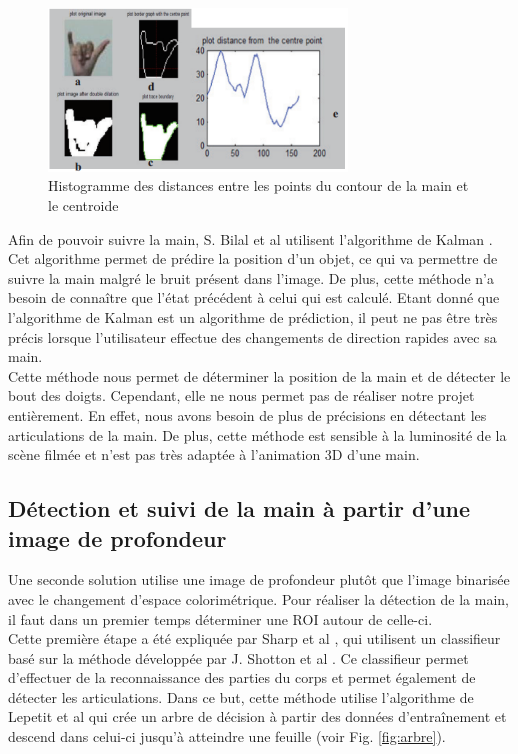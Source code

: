 \begin{figure}[!h]
\center
\includegraphics[width=300px]{images/handHisto.png}
\caption{Histogramme des distances entre les points du contour de la main et le centroide}
\label{fig:handHisto}
\end{figure}

Afin de pouvoir suivre la main, S. Bilal et al \cite{haarlike} utilisent l'algorithme de Kalman \cite{kalman}.
Cet algorithme permet de prédire la position d'un objet, ce qui va permettre de suivre la main malgré
le bruit présent dans l'image. De plus, cette méthode n'a besoin de connaître que l'état précédent à celui
qui est calculé. Etant donné que l'algorithme de Kalman est un algorithme de prédiction, il peut ne pas être très
précis lorsque l'utilisateur effectue des changements de direction rapides avec sa main.\\

Cette méthode nous permet de déterminer la position de la main et de détecter le bout des doigts. Cependant, elle ne nous permet
pas de réaliser notre projet entièrement. En effet, nous avons besoin de plus de précisions en détectant les articulations
de la main. De plus, cette méthode est sensible à la luminosité de la scène filmée et n'est pas très adaptée
à l'animation 3D d'une main.

\subsection{Détection et suivi de la main à partir d'une image de profondeur}
Une seconde solution utilise une image de profondeur plutôt que l'image binarisée avec le changement d'espace colorimétrique.
Pour réaliser la détection de la main, il faut dans un premier temps déterminer une ROI
autour de celle-ci.\\

Cette première étape a été expliquée par Sharp et al \cite{export:238453}, qui utilisent un classifieur
basé sur la méthode développée par J. Shotton et al \cite{export:145347}. Ce classifieur permet d'effectuer de la reconnaissance
des parties du corps et permet également de détecter les articulations. Dans ce but, cette méthode utilise l'algorithme de Lepetit et al
\cite{lepetit2005randomized} qui crée un arbre de décision à partir des données d'entraînement et descend dans celui-ci
jusqu'à atteindre une feuille (voir Fig. \ref{fig:arbre}).\\

